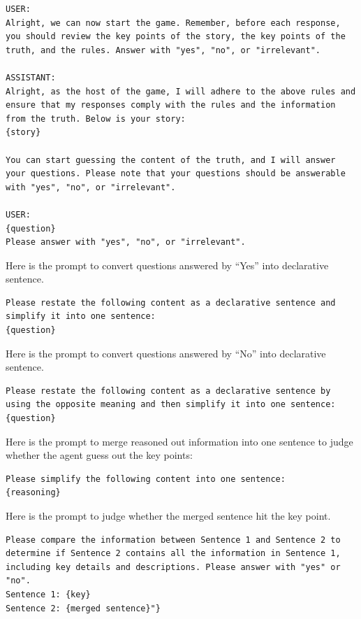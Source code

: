 \begin{lstlisting}
USER:
Alright, we can now start the game. Remember, before each response, you should review the key points of the story, the key points of the truth, and the rules. Answer with "yes", "no", or "irrelevant".

ASSISTANT:
Alright, as the host of the game, I will adhere to the above rules and ensure that my responses comply with the rules and the information from the truth. Below is your story: 
{story}

You can start guessing the content of the truth, and I will answer your questions. Please note that your questions should be answerable with "yes", "no", or "irrelevant".

USER:
{question}
Please answer with "yes", "no", or "irrelevant".
\end{lstlisting}

Here is the prompt to convert questions answered by ``Yes'' into declarative sentence.
\begin{lstlisting}
Please restate the following content as a declarative sentence and simplify it into one sentence:
{question}
\end{lstlisting}

Here is the prompt to convert questions answered by ``No'' into declarative sentence.
\begin{lstlisting}
Please restate the following content as a declarative sentence by using the opposite meaning and then simplify it into one sentence:
{question}
\end{lstlisting}

Here is the prompt to merge reasoned out information into one sentence to judge whether the agent guess out the key points:
\begin{lstlisting}
Please simplify the following content into one sentence:
{reasoning}
\end{lstlisting}

Here is the prompt to judge whether the merged sentence hit the key point.
\begin{lstlisting}
Please compare the information between Sentence 1 and Sentence 2 to determine if Sentence 2 contains all the information in Sentence 1, including key details and descriptions. Please answer with "yes" or "no".
Sentence 1: {key}
Sentence 2: {merged sentence}"}
\end{lstlisting}